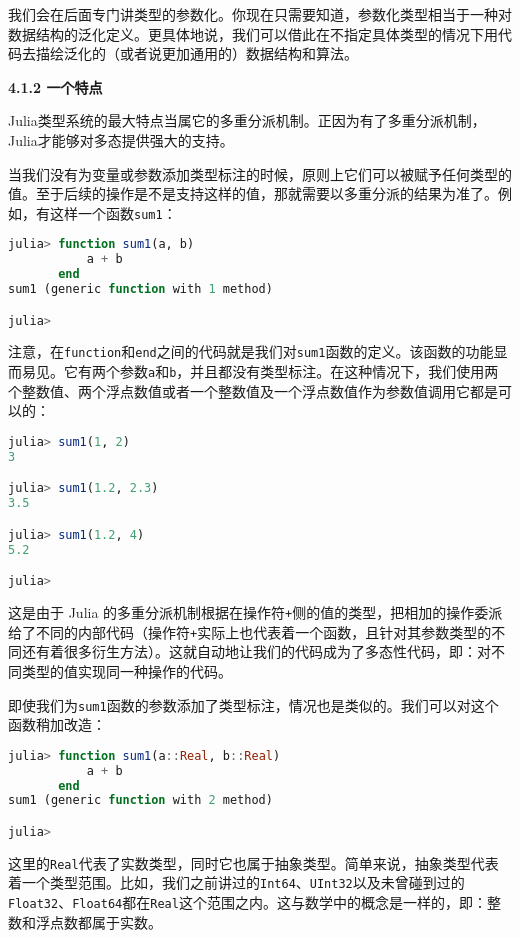 我们会在后面专门讲类型的参数化。你现在只需要知道，参数化类型相当于一种对数据结构的泛化定义。更具体地说，我们可以借此在不指定具体类型的情况下用代码去描绘泛化的（或者说更加通用的）数据结构和算法。

\textbf{4.1.2 一个特点}

Julia类型系统的最大特点当属它的多重分派机制。正因为有了多重分派机制，Julia才能够对多态提供强大的支持。

当我们没有为变量或参数添加类型标注的时候，原则上它们可以被赋予任何类型的值。至于后续的操作是不是支持这样的值，那就需要以多重分派的结果为准了。例如，有这样一个函数\verb`sum1`：

\begin{lstlisting}[language=julia]
julia> function sum1(a, b)
           a + b
       end
sum1 (generic function with 1 method)

julia> 
\end{lstlisting}

注意，在\verb`function`和\verb`end`之间的代码就是我们对\verb`sum1`函数的定义。该函数的功能显而易见。它有两个参数\verb`a`和\verb`b`，并且都没有类型标注。在这种情况下，我们使用两个整数值、两个浮点数值或者一个整数值及一个浮点数值作为参数值调用它都是可以的：

\begin{lstlisting}[language=julia]
julia> sum1(1, 2)
3

julia> sum1(1.2, 2.3)
3.5

julia> sum1(1.2, 4)
5.2

julia> 
\end{lstlisting}

这是由于 Julia 的多重分派机制根据在操作符\verb`+`侧的值的类型，把相加的操作委派给了不同的内部代码（操作符\verb`+`实际上也代表着一个函数，且针对其参数类型的不同还有着很多衍生方法）。这就自动地让我们的代码成为了多态性代码，即：对不同类型的值实现同一种操作的代码。

即使我们为\verb`sum1`函数的参数添加了类型标注，情况也是类似的。我们可以对这个函数稍加改造：

\begin{lstlisting}[language=julia]
julia> function sum1(a::Real, b::Real)
           a + b
       end
sum1 (generic function with 2 method)

julia> 
\end{lstlisting}

这里的\verb`Real`代表了实数类型，同时它也属于抽象类型。简单来说，抽象类型代表着一个类型范围。比如，我们之前讲过的\verb`Int64`、\verb`UInt32`以及未曾碰到过的\verb`Float32`、\verb`Float64`都在\verb`Real`这个范围之内。这与数学中的概念是一样的，即：整数和浮点数都属于实数。

